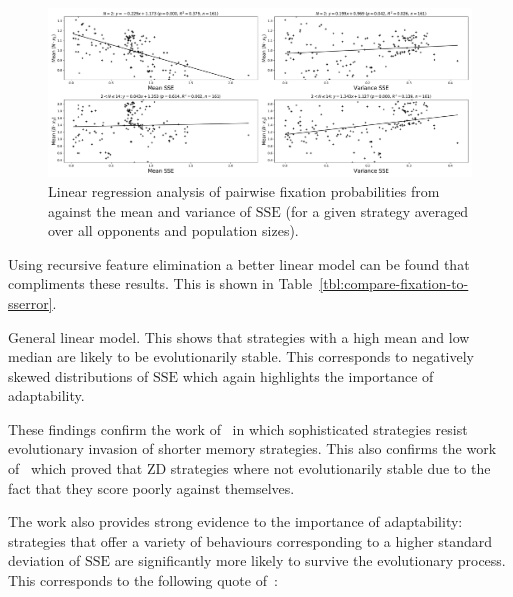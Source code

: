 \documentclass[a4paper]{article}
\newcommand{\SSe}{\text{SSE}}
\begin{document}
\begin{figure}[!hbtp]
    \centering
    \includegraphics[width=\textwidth]{./assets/img/compare-fixation-to-sserror/main.pdf}
    \caption{Linear regression analysis of pairwise fixation probabilities
    from~\cite{Moran1707} against the mean and variance of
    \(\SSe\) (for a given strategy averaged over all opponents and population
    sizes).}
    \label{fig:compare-fixation-to-sserror}
\end{figure}

Using recursive feature elimination a better linear model can be found that
compliments these results. This is shown in
Table~\ref{tbl:compare-fixation-to-sserror}.

\begin{table}[!hbtp]
    \begin{center}
    \tiny
    
    \end{center}
    \caption{General linear model. This shows that strategies with a high mean
        and low median are likely to be evolutionarily stable. This corresponds
        to negatively skewed distributions of \(\SSe\) which again highlights
        the importance of adaptability.}
    \label{tbl:compare-fixation-to-sserror}
\end{table}

These findings confirm the work of~\cite{Moran1707} in which sophisticated
strategies resist evolutionary invasion of shorter memory strategies. This also
confirms the work of~\cite{adami2013evolutionary, hilbe2015partners} which
proved that ZD strategies where not evolutionarily stable due to the fact that
they score poorly against themselves.

The work also provides strong evidence to the importance of adaptability:
strategies that offer a variety of behaviours corresponding to a higher standard
deviation of \(\SSe\) are significantly more likely to survive the
evolutionary process. This corresponds to the following quote
of~\cite{darwin1869origin}:
\end{document}
